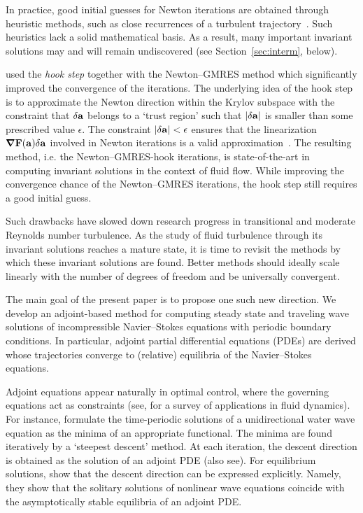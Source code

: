 \documentclass{jfm}
\begin{document}
In practice, good initial guesses for Newton iterations are obtained through heuristic methods,
such as close recurrences of a turbulent trajectory~\citep{pchaot,kawahara06,DV04,CviGib10}.
Such heuristics lack a
solid
mathematical
basis. As a result, many important invariant solutions may and will remain undiscovered
(see Section~\ref{sec:interm}, below).

\cite{DV04} used the \emph{hook step}
together with the Newton--GMRES
method which significantly improved the convergence of the iterations. The
underlying idea of the hook step is to
approximate the Newton direction within the Krylov subspace with the constraint that
$\delta \mathbf a$ belongs to a `trust region' such that
$|\delta \mathbf a|$ is smaller than some prescribed value $\epsilon$. The
constraint $|\delta\mathbf a|<\epsilon$ ensures that the linearization
$\mbox{\boldmath $\nabla$}\mathbf F(\mathbf a)\delta\mathbf a$ involved in Newton iterations is a valid approximation~\citep{DS}.
The resulting method, i.e. the Newton--GMRES-hook iterations, is state-of-the-art
in computing invariant solutions in the context of fluid flow.
While improving the convergence chance of
the Newton--GMRES iterations, the hook step still requires a good
initial guess.

Such drawbacks have slowed down research progress in transitional and moderate Reynolds
number turbulence.
As the study of fluid turbulence through its invariant solutions reaches a mature state, it is time
to revisit the methods by which these invariant solutions are found. Better
methods should ideally scale linearly with the number of degrees of freedom and be
universally convergent.

The main goal of the present paper is to propose one such new direction.
We develop an adjoint-based method for computing steady state and
traveling wave solutions of incompressible Navier--Stokes equations with periodic
boundary conditions. In particular, adjoint partial differential equations (PDEs) are derived whose 
trajectories converge to
(relative) equilibria of the Navier--Stokes equations.

Adjoint equations appear naturally in optimal control, where the governing equations
act as constraints (see, for a survey of applications in fluid dynamics). 
For instance, formulate the
time-periodic solutions of a unidirectional water wave equation
as the minima of an appropriate functional. The minima are found 
iteratively by
a `steepest descent' method.
At each iteration,
the descent direction is obtained as the solution of an adjoint PDE (also see).
For equilibrium solutions, show that the descent direction can be expressed explicitly.
Namely, they show that the solitary solutions of nonlinear wave equations coincide with the asymptotically stable equilibria of 
an adjoint PDE.
\end{document}

